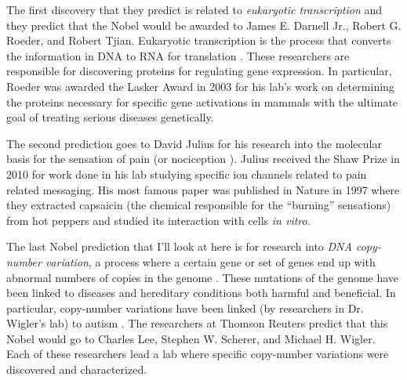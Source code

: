 \documentclass[12pt]{article}
\begin{document}
The first discovery that they predict is related to \emph{eukaryotic
transcription} and they predict that the Nobel would be awarded to James E.
Darnell Jr., Robert G. Roeder, and Robert Tjian.
Eukaryotic transcription is the process that converts the information in DNA
to RNA for translation \cite{eukaryotic}.
These researchers are responsible for discovering proteins for regulating gene
expression.
In particular, Roeder was awarded the Lasker Award in 2003 \cite{lasker} for
his lab's work on determining the proteins necessary for specific gene
activations in mammals with the ultimate goal of treating serious diseases
genetically.

The second prediction goes to David Julius for his research into the molecular
basis for the sensation of pain (or nociception \cite{nociception}).
Julius received the Shaw Prize in 2010 for work done in his lab studying
specific ion channels related to pain related messaging.
His most famous paper was published in Nature in 1997 \cite{julius} where they
extracted capsaicin (the chemical responsible for the ``burning'' sensations)
from hot peppers and studied its interaction with cells \emph{in vitro}.

The last Nobel prediction that I'll look at here is for research into
\emph{DNA copy-number variation}, a process where a certain gene or set of
genes end up with abnormal numbers of copies in the genome \cite{cnv}.
These mutations of the genome have been linked to diseases and hereditary
conditions both harmful and beneficial.
In particular, copy-number variations have been linked (by researchers in Dr.
Wigler's lab) to autism \cite{novo}.
The researchers at Thomson Reuters predict that this Nobel would go to Charles
Lee, Stephen W. Scherer, and Michael H. Wigler.
Each of these researchers lead a lab where specific copy-number variations
were discovered and characterized.

\newpage
\mbox{}
\newpage


{}

\end{document}
